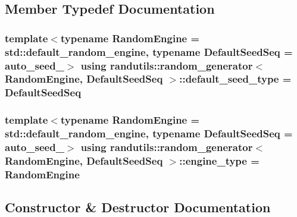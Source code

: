 \subsection{Member Typedef Documentation}
\hypertarget{classrandutils_1_1random__generator_a424b01b5232f91d42163369ad6bd3b11}{}
\subsubsection[{default\+\_\+seed\+\_\+type}]{\setlength{\rightskip}{0pt plus 5cm}template$<$typename Random\+Engine  = std\+::default\+\_\+random\+\_\+engine, typename Default\+Seed\+Seq  = auto\+\_\+seed\+\_$>$ using {\bf randutils\+::random\+\_\+generator}$<$ Random\+Engine, Default\+Seed\+Seq $>$\+::{\bf default\+\_\+seed\+\_\+type} =  Default\+Seed\+Seq}\label{classrandutils_1_1random__generator_a424b01b5232f91d42163369ad6bd3b11}
\hypertarget{classrandutils_1_1random__generator_a7ccbb95be67d7cd19f4b128be21b4ac3}{}
\subsubsection[{engine\+\_\+type}]{\setlength{\rightskip}{0pt plus 5cm}template$<$typename Random\+Engine  = std\+::default\+\_\+random\+\_\+engine, typename Default\+Seed\+Seq  = auto\+\_\+seed\+\_$>$ using {\bf randutils\+::random\+\_\+generator}$<$ Random\+Engine, Default\+Seed\+Seq $>$\+::{\bf engine\+\_\+type} =  Random\+Engine}\label{classrandutils_1_1random__generator_a7ccbb95be67d7cd19f4b128be21b4ac3}


\subsection{Constructor \& Destructor Documentation}
\hypertarget{classrandutils_1_1random__generator_abfccab3973766dbd0526bc8269f26cff}{}
